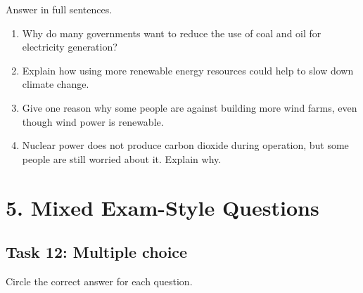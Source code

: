\documentclass[11pt,a4paper]{article}
\begin{document}
Answer in full sentences.

\begin{enumerate}[label=\arabic*)]
    \item Why do many governments want to reduce the use of coal and oil for electricity generation?
    \vspace{2.5cm}

    \item Explain how using more renewable energy resources could help to slow down climate change.
    \vspace{2.5cm}

    \item Give one reason why some people are against building more wind farms, even though wind power is renewable.
    \vspace{2.5cm}

    \item Nuclear power does not produce carbon dioxide during operation, but some people are still worried about it. Explain why.
    \vspace{2.5cm}
\end{enumerate}

\newpage

\section*{5. Mixed Exam-Style Questions}

\subsection*{Task 12: Multiple choice}

Circle the correct answer for each question.
\end{document}
